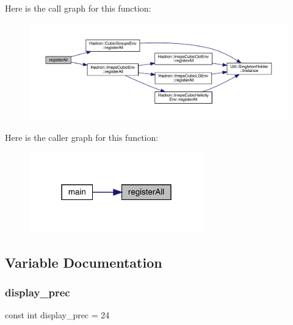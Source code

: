 Here is the call graph for this function\+:
\nopagebreak
\begin{figure}[H]
\begin{center}
\leavevmode
\includegraphics[width=350pt]{d1/de2/adat-devel_2main_2irreputils_2cgs__table_8cc_a3872416cf70cb24d7da1008a3f3b1d96_cgraph}
\end{center}
\end{figure}
Here is the caller graph for this function\+:
\nopagebreak
\begin{figure}[H]
\begin{center}
\leavevmode
\includegraphics[width=214pt]{d1/de2/adat-devel_2main_2irreputils_2cgs__table_8cc_a3872416cf70cb24d7da1008a3f3b1d96_icgraph}
\end{center}
\end{figure}


\subsection{Variable Documentation}
\mbox{\label{adat-devel_2main_2irreputils_2cgs__table_8cc_a473744fa8268c6d49feba30498a6cace}} 
\subsubsection{\texorpdfstring{display\_prec}{display\_prec}}
{\footnotesize\ttfamily const int display\+\_\+prec = 24}

